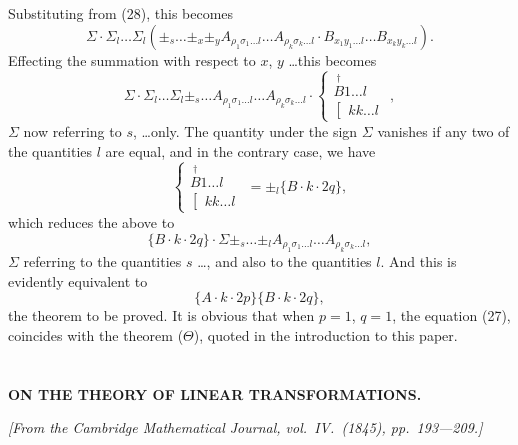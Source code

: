 \documentclass[11pt,a4paper]{book}
\begin{document}
Substituting from (28), this becomes
\[
\Sigma \cdot \Sigma_l \ldots \Sigma_l (\pm_s \ldots \pm_x \pm_y A_{\rho_1\sigma_1\ldots l} \ldots A_{\rho_k\sigma_k\ldots l} \cdot
B_{x_1y_1\ldots l} \ldots B_{x_ky_k\ldots l})
\tag{30}.
\]
Effecting the summation with respect to $x$, $y$ \ldots this becomes
\[
\Sigma \cdot \Sigma_l \ldots \Sigma_l \pm_s \ldots A_{\rho_1\sigma_1\ldots l} \ldots A_{\rho_k\sigma_k\ldots l} \cdot
\left\{\begin{array}{c}
\stackrel{\dagger}{B} 1 \ldots l \\
\left[\begin{array}{c}
kk \ldots l
\end{array}\right.
\end{array}\right.
\tag{31},
\]
$\Sigma$ now referring to $s$, \ldots only. The quantity under the sign $\Sigma$ vanishes if any two
of the quantities $l$ are equal, and in the contrary case, we have
\[
\left\{\begin{array}{c}
\stackrel{\dagger}{B} 1 \ldots l \\
\left[\begin{array}{c}
kk \ldots l
\end{array}\right.
\end{array}\right.
= \pm_l \{B \cdot k \cdot 2q\}
\tag{32},
\]
which reduces the above to
\[
\{B \cdot k \cdot 2q\} \cdot \Sigma \pm_s \ldots \pm_l A_{\rho_1\sigma_1\ldots l} \ldots A_{\rho_k\sigma_k\ldots l}
\tag{33},
\]
$\Sigma$ referring to the quantities $s$ \ldots, and also to the quantities $l$. And this is evidently
equivalent to
\[
\{A \cdot k \cdot 2p\} \{B \cdot k \cdot 2q\}
\tag{34},
\]
the theorem to be proved. It is obvious that when $p=1$, $q=1$, the equation (27),
coincides with the theorem ($\Theta$), quoted in the introduction to this paper.

\newpage
\setcounter{section}{12}


\section{}
\begin{center}
\textbf{ON THE THEORY OF LINEAR TRANSFORMATIONS.}
\end{center}
\textit{[From the Cambridge Mathematical Journal, vol.\ IV.\ (1845), pp.\ 193---209.]}
\end{document}
